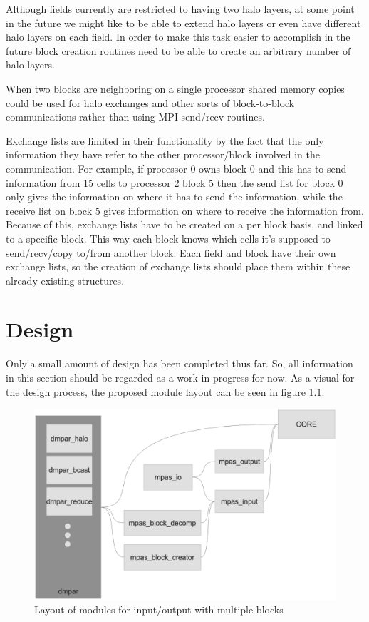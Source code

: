 \documentclass[11pt]{report}
\begin{document}
Although fields currently are restricted to having two halo layers, at some
point in the future we might like to be able to extend halo layers or even have
different halo layers on each field. In order to make this task easier to
accomplish in the future block creation routines need to be able to create an
arbitrary number of halo layers. 

When two blocks are neighboring on a single processor shared memory copies
could be used for halo exchanges and other sorts of block-to-block
communications rather than using MPI send/recv routines.

Exchange lists are limited in their functionality by the fact that the only
information they have refer to the other processor/block involved in the
communication. For example, if processor 0 owns block 0 and this has to send
information from 15 cells to processor 2 block 5 then the send list for block 0
only gives the information on where it has to send the information, while the
receive list on block 5 gives information on where to receive the information
from. Because of this, exchange lists have to be created on a per block basis,
and linked to a specific block. This way each block knows which cells it's
supposed to send/recv/copy to/from another block. Each field and block have
their own exchange lists, so the creation of exchange lists should place them
within these already existing structures.

%
%
\chapter{Design}

Only a small amount of design has been completed thus far. So, all information
in this section should be regarded as a work in progress for now. As a visual
for the design process, the proposed module layout can be seen in figure
\ref{fig:module_layout}.

\begin{figure}[H!]
	\centering
	\includegraphics[scale=0.4]{DesignLayout.eps}
	\caption{Layout of modules for input/output with multiple blocks}
	\label{fig:module_layout}
\end{figure}
\end{document}
